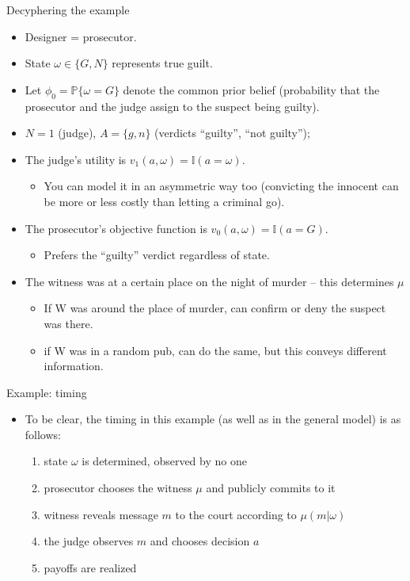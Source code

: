 \documentclass[english,10pt
,aspectratio=169
]{beamer}
\begin{document}
\begin{frame}{Decyphering the example}
\begin{itemize}
	\item Designer = prosecutor.
	\item State $\omega \in \{G,N\}$ represents true guilt. 
	\item Let $\phi_0 = \mathbb{P} \{ \omega = G \}$ denote the common prior belief (probability that the prosecutor and the judge assign to the suspect being guilty).
	\item $N=1$ (judge), $A = \{g,n\}$ (verdicts ``guilty'', ``not guilty'');
	\pause
	\item The judge's utility is $v_1(a,\omega) = \mathbb{I} (a=\omega)$.
	\begin{itemize}
		\item You can model it in an asymmetric way too (convicting the innocent can be more or less costly than letting a criminal go).
	\end{itemize}
	\item The prosecutor's objective function is $v_0(a,\omega) = \mathbb{I} (a=G)$.
	\begin{itemize}
		\item Prefers the ``guilty'' verdict regardless of state.
	\end{itemize}
	\pause
	\item The witness was at a certain place on the night of murder -- this determines $\mu$
	\begin{itemize}
		\item If W was around the place of murder, can confirm or deny the suspect was there.
		\item if W was in a random pub, can do the same, but this conveys different information.
	\end{itemize}
\end{itemize}
\end{frame}


\begin{frame}{Example: timing}
	\begin{itemize}
		\item To be clear, the timing in this example (as well as in the general model) is as follows:
		\begin{enumerate}
			\item state $\omega$ is determined, observed by no one
			\item prosecutor chooses the witness $\mu$ and publicly commits to it
			\item witness reveals message $m$ to the court according to $\mu(m|\omega)$
			\item the judge observes $m$ and chooses decision $a$
			\item payoffs are realized
		\end{enumerate}
	\end{itemize}
\end{frame}
\end{document}
